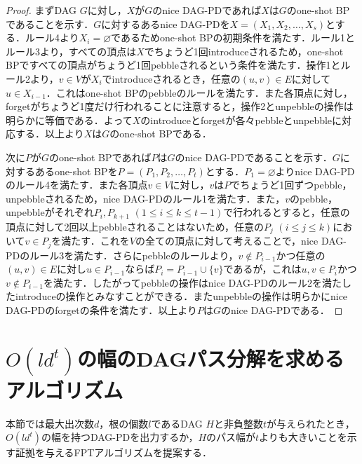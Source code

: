 \documentclass[master]{kuisthesis}		%
\theoremstyle{plain}
\theoremstyle{definition}
\begin{document}
\begin{proof}
    まずDAG $G$に対し，$X$が$G$のnice DAG-PDであれば$X$は$G$のone-shot BPであることを示す．$G$に対するあるnice DAG-PDを$X=(X_1, X_2, \dots, X_s)$とする．ルール4より$X_i = \varnothing$であるためone-shot BPの初期条件を満たす．ルール1とルール3より，すべての頂点は$X$でちょうど1回introduceされるため，one-shot BPですべての頂点がちょうど1回pebbleされるという条件を満たす．操作1とルール2より，$v \in V$が$X_i$でintroduceされるとき，任意の$(u, v)\in E$に対して$u \in X_{i-1}$．これはone-shot BPのpebbleのルールを満たす．また各頂点に対し，forgetがちょうど1度だけ行われることに注意すると，操作2とunpebbleの操作は明らかに等価である．よって$X$のintroduceとforgetが各々pebbleとunpebbleに対応する．以上より$X$は$G$のone-shot BPである．
    
    次に$P$が$G$のone-shot BPであれば$P$は$G$のnice DAG-PDであることを示す．$G$に対するあるone-shot BPを$P=(P_1, P_2, \dots, P_t)$とする．$P_1 = \varnothing$よりnice DAG-PDのルール4を満たす．また各頂点$v \in V$に対し，$v$は$P$でちょうど1回ずつpebble，unpebbleされるため，nice DAG-PDのルール1を満たす．また，$v$のpebble，unpebbleがそれぞれ$P_i, P_{k+1}$ $(1 \leq i \leq k \leq t-1)$で行われるとすると，任意の頂点に対して2回以上pebbleされることはないため，任意の$P_j$ $(i \leq j \leq k)$において$v \in P_j$を満たす．これを$V$の全ての頂点に対して考えることで，nice DAG-PDのルール3を満たす．さらにpebbleのルールより，$v \notin P_{i-1}$かつ任意の$(u, v) \in E$に対し$u \in P_{i-1}$ならば$P_i = P_{i-1} \cup \{v\}$であるが，これは$u, v \in P_i$かつ$v \notin P_{i-1}$を満たす．したがってpebbleの操作はnice DAG-PDのルール2を満たしたintroduceの操作とみなすことができる．またunpebbleの操作は明らかにnice DAG-PDのforgetの条件を満たす．以上より$P$は$G$のnice DAG-PDである．
\end{proof}


















\section{$O(ld^t)$の幅のDAGパス分解を求めるアルゴリズム} %

本節では最大出次数$d$，根の個数$l$であるDAG $H$と非負整数$t$が与えられたとき，$O(ld^t)$の幅を持つDAG-PDを出力するか，$H$のパス幅が$t$よりも大きいことを示す証拠を与えるFPTアルゴリズムを提案する．
\end{document}
